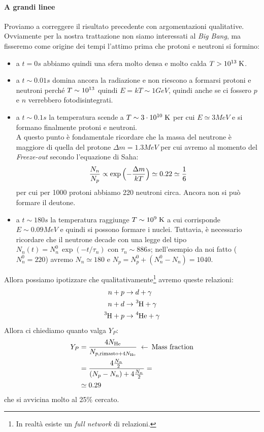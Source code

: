 \paragraph{A grandi linee}\label{a.grandi.linee} Proviamo a correggere il risultato precedente con argomentazioni qualitative. Ovviamente per la nostra trattazione non siamo interessati al \textit{Big Bang}, ma fisseremo come origine dei tempi l'attimo prima che protoni e neutroni si formino: 
\begin{itemize}
    \item a $t=0\unit{s}$ abbiamo quindi una sfera molto densa e molto calda $T>10^{13}\;\mbox{K}$.  
    \item a $t\sim 0.01\unit{s}$ domina ancora la radiazione e non riescono a formarsi protoni e neutroni perché $T\sim10^{13}$ quindi $E=kT\sim 1\unit{GeV}$, quindi anche se ci fossero $p$ e $n$ verrebbero fotodisintegrati.
    \item a $t\sim 0.1\unit{s}$ la temperatura scende a $T\sim 3\cdot10^{10}\;\mbox{K}$ per cui $E\simeq 3\unit{MeV}$ e si formano finalmente protoni e neutroni.\\ 
    A questo punto è fondamentale ricordare che la massa del neutrone è maggiore di quella del protone $\Delta m = 1.3\unit{MeV}$ per cui avremo al momento del \textit{Freeze-out} secondo l'equazione di Saha:
    $$\frac{N_n}{N_p}\propto \exp{\Bigl ( -\frac{\Delta m}{kT} \Bigr )} \simeq 0.22 \simeq \frac{1}{6}$$
    per cui per 1000 protoni abbiamo 220 neutroni circa. Ancora non si può formare il deutone.
    \item a $t\sim 180\unit{s}$ la temperatura raggiunge $T\sim 10^{9}\;\mbox{K}$ a cui corrisponde $E\sim 0.09\unit{MeV}$ e quindi si possono formare i nuclei. Tuttavia, è necessario ricordare che il neutrone decade con una legge del tipo $N_n(t) = N_n^0 \, \exp{(-t/\tau_n)}$ con $\tau_n \sim 886\unit{s}$; nell'esempio da noi fatto ($N_n^0= 220$) avremo $N_n \simeq 180$ e $N_p = N_p^0 + (N_n^0-N_n) = 1040$.
\end{itemize}
\noindent Allora possiamo ipotizzare che qualitativamente\footnote{In realtà esiste un \textit{full network} di relazioni.} avremo queste relazioni:
\begin{displaymath}
\begin{aligned}
n + p &\to d + \gamma \\
n + d &\to \ce{^3H} + \gamma \\
\ce{^3H} + p &\to \ce{^4He} + \gamma
\end{aligned}
\end{displaymath}
Allora ci chiediamo quanto valga $Y_P$:
\begin{displaymath}
\begin{aligned}
Y_P &= \frac{4 N_{\ce{He}}}{N_{p,\text{rimasto} + 4N_{\ce{He}} }} \;\leftarrow\: \text{Mass fraction}\\
&= \frac{4 \frac{N_n}{2}}{(N_p - N_n) + 4\frac{N_n}{2}} = \\
&\simeq 0.29
\end{aligned}
\end{displaymath}
che si avvicina molto al 25\% cercato.




    